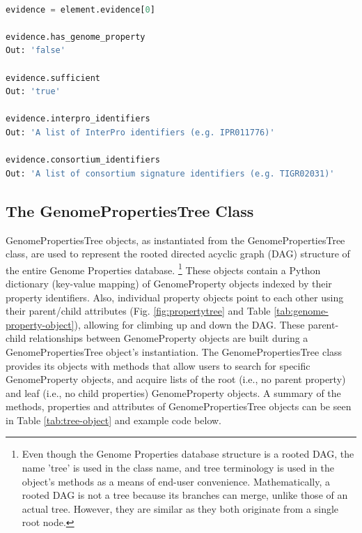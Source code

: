 \begin{lstlisting}[language=Python]

evidence = element.evidence[0]
	
evidence.has_genome_property
Out: 'false'

evidence.sufficient
Out: 'true'

evidence.interpro_identifiers
Out: 'A list of InterPro identifiers (e.g. IPR011776)'

evidence.consortium_identifiers 
Out: 'A list of consortium signature identifiers (e.g. TIGR02031)'

\end{lstlisting}

\subsection{The GenomePropertiesTree Class} \label{GenomePropertiesTree-Class}

GenomePropertiesTree objects, as instantiated from the GenomePropertiesTree class, are used to represent the rooted directed acyclic graph (DAG) structure of the entire Genome Properties database. \footnote{Even though the Genome Properties database structure is a rooted DAG, the name 'tree' is used in the class name, and tree terminology is used in the object's methods as a means of end-user convenience. Mathematically, a rooted DAG is not a tree because its branches can merge, unlike those of an actual tree. However, they are similar as they both originate from a single root node.} These objects contain a Python dictionary (key-value mapping) of GenomeProperty objects indexed by their property identifiers. Also, individual property objects point to each other using their parent/child attributes (Fig. \ref{fig:propertytree} and Table \ref{tab:genome-property-object}), allowing for climbing up and down the DAG. These parent-child relationships between GenomeProperty objects are built during a GenomePropertiesTree object's instantiation. The GenomePropertiesTree class provides its objects with methods that allow users to search for specific GenomeProperty objects, and acquire lists of the root (i.e., no parent property) and leaf (i.e., no child properties) GenomeProperty objects. A summary of the methods, properties and attributes of GenomePropertiesTree objects can be seen in Table \ref{tab:tree-object} and example code below.

